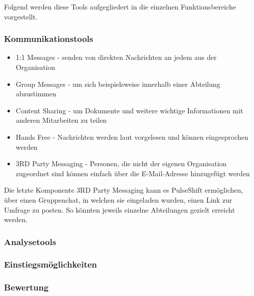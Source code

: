 Folgend werden diese Tools aufgegliedert in die einzelnen Funktionsbereiche vorgestellt.

\subsubsection{Kommunikationstools}

\begin{itemize}
\item 1:1 Messages - senden von direkten Nachrichten an jedem aus der Organisation
\item Group Messages - um sich beispielsweise innerhalb einer Abteilung abzustimmen
\item Content Sharing - um Dokumente und weitere wichtige Informationen mit anderen Mitarbeiten zu teilen
\item Hands Free - Nachrichten werden laut vorgelesen und können eingesprochen werden
\item 3RD Party Messaging - Personen, die nicht der eigenen Organisation zugeordnet sind können einfach über die E-Mail-Adresse hinzugefügt werden
\end{itemize}

Die letzte Komponente 3RD Party Messaging kann es PulseShift ermöglichen, über einen Gruppenchat, in welchen sie eingeladen wurden, einen Link zur Umfrage zu posten. So könnten jeweils einzelne Abteilungen gezielt erreicht werden.

\subsubsection{Analysetools}

\subsubsection{Einstiegsmöglichkeiten}

\subsubsection{Bewertung}
